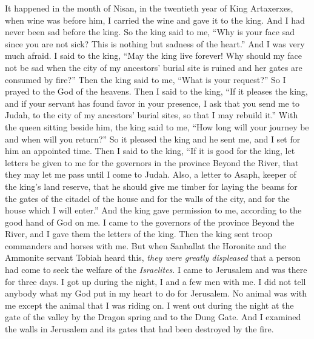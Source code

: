 \begin{biblechapter} %
 It happened in the month of Nisan, in the twentieth year of King Artaxerxes, when wine was before him, I carried the wine and gave it to the king. And I had never been sad before the king.
\verse So the king said to me, “Why is your face sad since you are not sick? This is nothing but sadness of the heart.” And I was very much afraid.
\verse I said to the king, “May the king live forever! Why should my face not be sad when the city of my ancestors’ burial site is ruined and her gates are consumed by fire?”
\verse Then the king said to me, “What is your request?” So I prayed to the God of the heavens.
\verse Then I said to the king, “If it pleases the king, and if your servant has found favor in your presence, I ask that you send me to Judah, to the city of my ancestors’ burial sites, so that I may rebuild it.”
\verse With the queen sitting beside him, the king said to me, “How long will your journey be and when will you return?” So it pleased the king and he sent me, and I set for him an appointed time.
\verse Then I said to the king, “If it is good for the king, let letters be given to me for the governors in the province Beyond the River, that they may let me pass until I come to Judah.
\verse Also, a letter to Asaph, keeper of the king’s land reserve, that he should give me timber for laying the beams for the gates of the citadel of the house and for the walls of the city, and for the house which I will enter.” And the king gave permission to me, according to the good hand of God on me.
\verse I came to the governors of the province Beyond the River, and I gave them the letters of the king. Then the king sent troop commanders and horses with me.
\verse But when Sanballat the Horonite and the Ammonite servant Tobiah heard this, \textit{they were greatly displeased} that a person had come to seek the welfare of the \textit{Israelites}.
 I came to Jerusalem and was there for three days.
\verse I got up during the night, I and a few men with me. I did not tell anybody what my God put in my heart to do for Jerusalem. No animal was with me except the animal that I was riding on.
\verse I went out during the night at the gate of the valley by the Dragon spring and to the Dung Gate. And I examined the walls in Jerusalem and its gates that had been destroyed by the fire.

\end{biblechapter}
